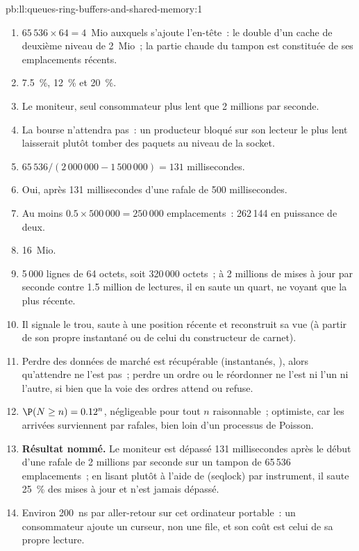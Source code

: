 \begin{solution}{pb:ll:queues-ring-buffers-and-shared-memory:1}
\begin{enumerate}
\item $65\,536 \times 64 = 4$~Mio auxquels s'ajoute l'en-tête~: le double d'un cache de deuxième niveau de 2~Mio~; la partie chaude du tampon est constituée de ses emplacements récents.
\item 7.5~\%, 12~\% et 20~\%.
\item Le moniteur, seul consommateur plus lent que 2 millions par seconde.
\item La bourse n'attendra pas~: un producteur bloqué sur son lecteur le plus lent laisserait plutôt tomber des paquets au niveau de la socket.
\item $65\,536/(2\,000\,000 - 1\,500\,000) = 131$ millisecondes.
\item Oui, après 131 millisecondes d'une rafale de 500 millisecondes.
\item Au moins $0.5 \times 500\,000 = 250\,000$ emplacements~: 262\,144 en puissance de deux.
\item 16~Mio.
\item 5\,000 lignes de 64 octets, soit 320\,000 octets~; à 2 millions de mises à jour par seconde contre 1.5 million de lectures, il en saute un quart,
ne voyant que la plus récente.
\item Il signale le trou, saute à une position récente et reconstruit sa vue (à partir de son propre instantané ou de celui du constructeur de carnet).
\item Perdre des données de marché est récupérable (instantanés, ), alors qu'attendre ne l'est pas~; perdre un ordre ou le réordonner ne l'est ni l'un ni l'autre, si bien que la
voie des ordres attend ou refuse.
\item $\P(N \ge n) = 0.12^n$, négligeable pour tout $n$ raisonnable~; optimiste, car les arrivées surviennent par rafales, bien loin d'un processus de Poisson.
\item \textbf{Résultat nommé.} Le moniteur est dépassé 131 millisecondes après le début d'une rafale de 2 millions par seconde sur un tampon de 65\,536 emplacements~; en lisant
plutôt à l'aide de  (seqlock) par instrument, il saute 25~\% des mises à jour et n'est jamais dépassé.
\item Environ \qty{200}{\nano\second} par aller-retour sur cet ordinateur portable~: un consommateur ajoute un curseur, non une file, et son coût est celui de sa propre lecture.

\end{enumerate}
\end{solution}

